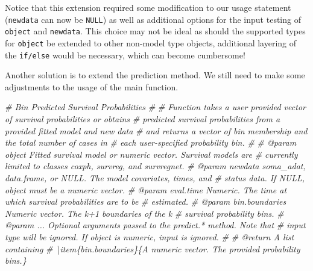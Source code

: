 \documentclass[
]{book}
\newenvironment{Shaded}{\begin{snugshade}}{\end{snugshade}}
\newcommand{\CommentTok}[1]{\textcolor[rgb]{0.56,0.35,0.01}{\textit{#1}}}
\begin{document}
Notice that this extension required some modification to our usage statement (\texttt{newdata} can now be \texttt{NULL}) as well as additional options for the input testing of \texttt{object} and \texttt{newdata}. This choice may not be ideal as should the supported types for \texttt{object} be extended to other non-model type objects, additional layering of the \texttt{if/else} would be necessary, which can become cumbersome!

Another solution is to extend the prediction method. We still need to make some adjustments to the usage of the main function.

\begin{Shaded}
\begin{Highlighting}[]
\CommentTok{\#\textquotesingle{} Bin Predicted Survival Probabilities}
\CommentTok{\#\textquotesingle{} }
\CommentTok{\#\textquotesingle{} Function takes a user provided vector of survival probabilities or obtains}
\CommentTok{\#\textquotesingle{}   predicted survival probabilities from a provided fitted model and new data}
\CommentTok{\#\textquotesingle{}   and returns a vector of bin membership and the total number of cases in}
\CommentTok{\#\textquotesingle{}   each user{-}specified probability bin.}
\CommentTok{\#\textquotesingle{}   }
\CommentTok{\#\textquotesingle{} @param object Fitted survival model or numeric vector. Survival models are }
\CommentTok{\#\textquotesingle{}   currently limited to classes \textasciigrave{}coxph\textasciigrave{}, \textasciigrave{}survreg\textasciigrave{}, and \textasciigrave{}survregnet\textasciigrave{}.}
\CommentTok{\#\textquotesingle{} @param newdata soma\_adat, data.frame, or NULL. The model covariates, times, and}
\CommentTok{\#\textquotesingle{}   status data. If NULL, \textasciigrave{}object\textasciigrave{} must be a numeric vector.}
\CommentTok{\#\textquotesingle{} @param eval.time Numeric. The time at which survival probabilities are to be}
\CommentTok{\#\textquotesingle{}   estimated.}
\CommentTok{\#\textquotesingle{} @param bin.boundaries Numeric vector. The k+1 boundaries of the k}
\CommentTok{\#\textquotesingle{}   survival probability bins.}
\CommentTok{\#\textquotesingle{} @param ... Optional arguments passed to the \textasciigrave{}predict.*\textasciigrave{} method. Note that}
\CommentTok{\#\textquotesingle{}   input \textasciigrave{}type\textasciigrave{} will be ignored. If \textasciigrave{}object\textasciigrave{} is numeric, input is ignored.}
\CommentTok{\#\textquotesingle{} }
\CommentTok{\#\textquotesingle{} @return A list containing}
\CommentTok{\#\textquotesingle{} \textbackslash{}item\{bin.boundaries\}\{A numeric vector. The provided probability bins.\}}

\end{Highlighting}
\end{Shaded}
\end{document}
